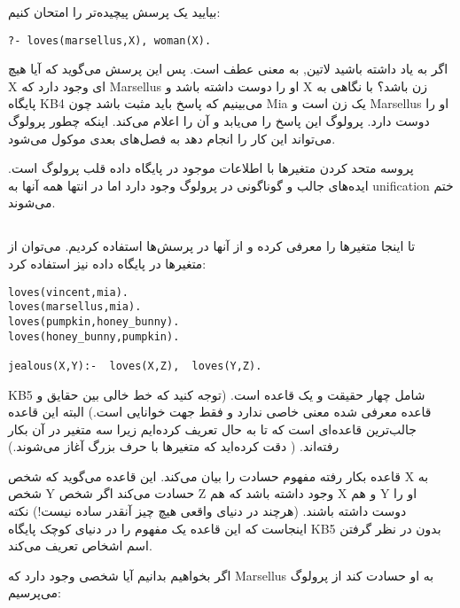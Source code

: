 بیایید یک پرسش پیچیده‌تر را امتحان کنیم:

\begin{latin}
\begin{lstlisting}
?- loves(marsellus,X), woman(X).
\end{lstlisting}
\end{latin}

اگر به یاد داشته باشید ‌لاتین{,} به معنی عطف است. پس این پرسش می‌گوید که آیا هیچ X ای وجود دارد که Marsellus او را دوست داشته باشد و X زن باشد؟ با نگاهی به پایگاه KB4 می‌بینیم که پاسخ باید مثبت باشد چون Mia یک زن است و Marsellus او را دوست دارد. پرولوگ این پاسخ را می‌یابد و آن را اعلام می‌کند. اینکه چطور پرولوگ می‌تواند این کار را انجام دهد به فصل‌های بعدی موکول می‌شود.

پروسه متحد کردن متغیرها با اطلاعات موجود در پایگاه داده قلب پرولوگ است. ایده‌های جالب و گوناگونی در پرولوگ وجود دارد اما در انتها همه آنها به unification ختم می‌شوند.\\

\subsection{}
تا اینجا متغیرها را معرفی کرده و از آنها در پرسش‌ها استفاده کردیم. می‌توان از متغیرها در پایگاه داده نیز استفاده کرد:

\begin{latin}
\begin{lstlisting}[title=KB5]
loves(vincent,mia). 
loves(marsellus,mia). 
loves(pumpkin,honey_bunny). 
loves(honey_bunny,pumpkin). 
    
jealous(X,Y):-  loves(X,Z),  loves(Y,Z).
\end{lstlisting}
\end{latin}

KB5 شامل چهار حقیقت و یک  قاعده است. (توجه کنید که خط خالی بین حقایق و قاعده معرفی شده معنی خاصی ندارد و فقط جهت خوانایی است.) البته این قاعده جالب‌ترین قاعده‌ای‌ است که تا به حال تعریف کرده‌ایم زیرا سه متغیر در آن بکار رفته‌اند. ( دقت کرده‌اید که متغیرها با حرف بزرگ آغاز می‌شوند.) 

قاعده بکار رفته مفهوم حسادت را بیان می‌کند. این قاعده می‌گوید که شخص X به شخص Y حسادت می‌کند اگر شخص Z وجود داشته باشد که هم X و هم Y او را دوست داشته باشند. (هرچند در دنیای واقعی هیچ چیز آنقدر ساده نیست!) نکته اینجاست که این قاعده یک مفهوم را در دنیای کوچک پایگاه KB5 بدون در نظر گرفتن اسم اشخاص تعریف می‌کند.

اگر بخواهیم بدانیم آیا شخصی وجود دارد که Marsellus به او حسادت کند از پرولوگ می‌پرسیم:

